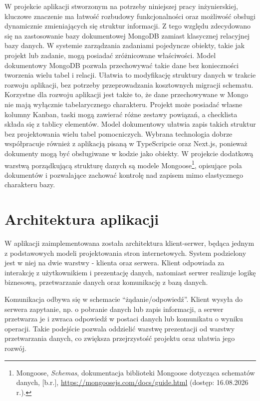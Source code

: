 \documentclass[12pt,a4paper,twoside]{report}
\newcommand{\FirstParagraph}{\noindent\ignorespaces}
\begin{document}
W projekcie aplikacji stworzonym na potrzeby niniejszej pracy inżynierskiej, kluczowe znaczenie ma łatwość rozbudowy funkcjonalności oraz możliwość obsługi dynamicznie zmieniających się struktur informacji. Z tego względu zdecydowano się na zastosowanie bazy dokumentowej MongoDB zamiast klasycznej relacyjnej bazy danych.
W systemie zarządzania zadaniami pojedyncze obiekty, takie jak projekt lub zadanie, mogą posiadać zróżnicowane właściwości. Model dokumentowy MongoDB pozwala przechowywać takie dane bez konieczności tworzenia wielu tabel i relacji. Ułatwia to modyfikację struktury danych w trakcie rozwoju aplikacji, bez potrzeby przeprowadzania kosztownych migracji schematu. Korzystne dla rozwoju aplikacji jest także to, że dane przechowywane w Mongo nie mają wyłącznie tabelarycznego charakteru. Projekt może posiadać własne kolumny Kanban, taski mogą zawierać różne zestawy powiązań, a checklista składa się z tablicy elementów. Model dokumentowy ułatwia zapis takich struktur bez projektowania wielu tabel pomocniczych. Wybrana technologia dobrze współpracuje również z aplikacją pisaną w TypeScripcie oraz Next.js, ponieważ dokumenty mogą być obsługiwane w kodzie jako obiekty. W projekcie dodatkową warstwą porządkującą strukturę danych są modele Mongoose\footnote{Mongoose, \emph{Schemas}, dokumentacja biblioteki Mongoose dotycząca schematów danych, [b.r.], \url{https://mongoosejs.com/docs/guide.html} (dostęp: 16.08.2026 r.).}, opisujące pola dokumentów i pozwalające zachować kontrolę nad zapisem mimo elastycznego charakteru bazy.

\chapter{Architektura aplikacji}

\FirstParagraph W aplikacji zaimplementowana została architektura klient-serwer, będąca jednym z podstawowych modeli projektowania stron internetowych. System podzielony jest w niej na dwie warstwy - klienta oraz serwera. Klient odpowiada za interakcję z użytkownikiem i prezentację danych, natomiast serwer realizuje logikę biznesową, przetwarzanie danych oraz komunikację z bazą danych. 

Komunikacja odbywa się w schemacie ``żądanie/odpowiedź''. Klient wysyła do serwera zapytanie, np. o pobranie danych lub zapis informacji, a serwer przetwarza je i zwraca odpowiedź w postaci danych lub komunikatu o wyniku operacji. Takie podejście pozwala oddzielić warstwę prezentacji od warstwy przetwarzania danych, co zwiększa przejrzystość projektu oraz ułatwia jego rozwój.
\end{document}
